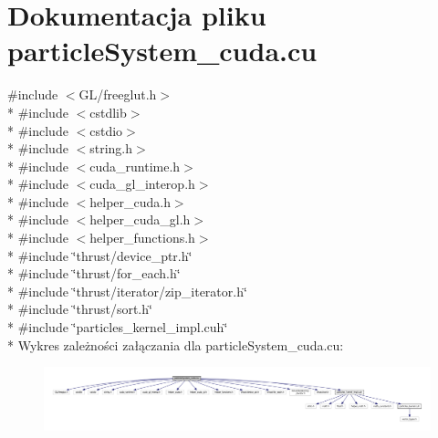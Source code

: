 \hypertarget{particle_system__cuda_8cu}{\section{Dokumentacja pliku particle\-System\-\_\-cuda.\-cu}
\label{particle_system__cuda_8cu}
}
{\ttfamily \#include $<$G\-L/freeglut.\-h$>$}\\*
{\ttfamily \#include $<$cstdlib$>$}\\*
{\ttfamily \#include $<$cstdio$>$}\\*
{\ttfamily \#include $<$string.\-h$>$}\\*
{\ttfamily \#include $<$cuda\-\_\-runtime.\-h$>$}\\*
{\ttfamily \#include $<$cuda\-\_\-gl\-\_\-interop.\-h$>$}\\*
{\ttfamily \#include $<$helper\-\_\-cuda.\-h$>$}\\*
{\ttfamily \#include $<$helper\-\_\-cuda\-\_\-gl.\-h$>$}\\*
{\ttfamily \#include $<$helper\-\_\-functions.\-h$>$}\\*
{\ttfamily \#include \char`\"{}thrust/device\-\_\-ptr.\-h\char`\"{}}\\*
{\ttfamily \#include \char`\"{}thrust/for\-\_\-each.\-h\char`\"{}}\\*
{\ttfamily \#include \char`\"{}thrust/iterator/zip\-\_\-iterator.\-h\char`\"{}}\\*
{\ttfamily \#include \char`\"{}thrust/sort.\-h\char`\"{}}\\*
{\ttfamily \#include \char`\"{}particles\-\_\-kernel\-\_\-impl.\-cuh\char`\"{}}\\*
Wykres zależności załączania dla particle\-System\-\_\-cuda.\-cu\-:\nopagebreak
\begin{figure}[H]
\begin{center}
\leavevmode
\includegraphics[width=350pt]{particle_system__cuda_8cu__incl}
\end{center}
\end{figure}
